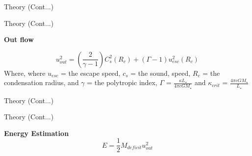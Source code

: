 \documentclass[12pt,a4paper]{beamer}
\begin{document}
\begin{frame}{Theory (Cont...)}
\begin{frame}{Theory (Cont...)}
\begin{block}{\centering\textbf{Out flow \cite{42, 43} \vspace*{.05cm}}}
\begin{itemize}
\begin{equation}
u_{out}^{2} = (\frac{2}{\gamma - 1})C_{s}^{2}(R_{c}) + (\Gamma
-1)u_{esc}^{2}(R_{c})
\end{equation}
Where, where $ u_{esc} $ = the escape speed, $ c_{s}$ = the sound,
speed, $ R_{c} $ =  the condensation radius, and $ \gamma $ = the
polytropic index, $\Gamma$ =
$\frac{\kappa{L_\star}}{4{\pi}c{G}{M_{\star}}}$  and
$\kappa_{crit}$ = $\frac{4{\pi}c{G}{M_{\star}}}{{L_\star}}$
\end{itemize}
\end{block}
\end{frame}



\begin{frame}{Theory (Cont...)}
\end{frame}

\begin{frame}{Theory (Cont...)}
\begin{block}{\centering\textbf{Energy Estimation}}
\begin{equation}
    E = \frac{1}{2}M_{deficit}u_{out}^{2}
\end{equation}
\end{block}
\end{frame}


\end{frame}
\end{document}
